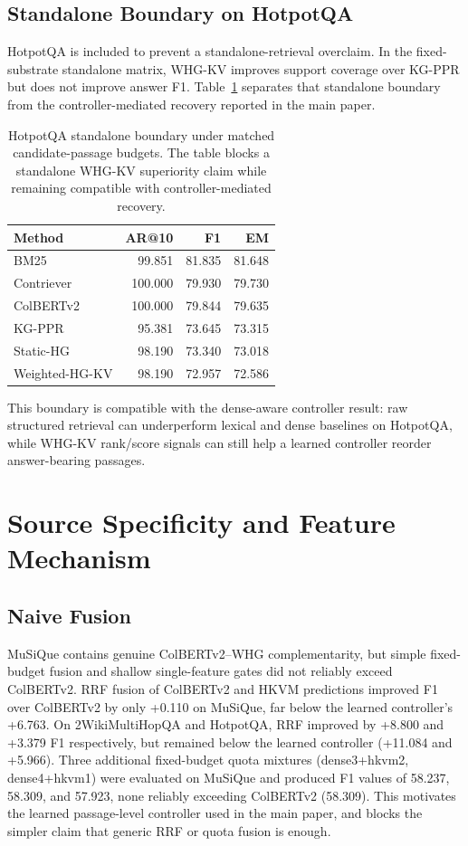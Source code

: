 \documentclass[conference]{IEEEtran}
\newcommand{\whg}{Weighted-HG-KV}
\begin{document}
\subsection{Standalone Boundary on HotpotQA}

HotpotQA is included to prevent a standalone-retrieval overclaim. In the fixed-substrate standalone matrix, WHG-KV improves support coverage over KG-PPR but does not improve answer F1. Table~\ref{tab:supp_hotpot_boundary} separates that standalone boundary from the controller-mediated recovery reported in the main paper.

\begin{table}[t]
\caption{HotpotQA standalone boundary under matched candidate-passage budgets. The table blocks a standalone WHG-KV superiority claim while remaining compatible with controller-mediated recovery.}
\label{tab:supp_hotpot_boundary}
\centering
\scriptsize
\begin{tabular}{lrrr}
\toprule
Method & AR@10 & F1 & EM \\
\midrule
BM25 & 99.851 & 81.835 & 81.648 \\
Contriever & 100.000 & 79.930 & 79.730 \\
ColBERTv2 & 100.000 & 79.844 & 79.635 \\
KG-PPR & 95.381 & 73.645 & 73.315 \\
Static-HG & 98.190 & 73.340 & 73.018 \\
\whg{} & 98.190 & 72.957 & 72.586 \\
\bottomrule
\end{tabular}
\end{table}

This boundary is compatible with the dense-aware controller result: raw structured retrieval can underperform lexical and dense baselines on HotpotQA, while WHG-KV rank/score signals can still help a learned controller reorder answer-bearing passages.

\section{Source Specificity and Feature Mechanism}

\subsection{Naive Fusion}

MuSiQue contains genuine ColBERTv2--WHG complementarity, but simple fixed-budget fusion and shallow single-feature gates did not reliably exceed ColBERTv2. RRF fusion of ColBERTv2 and HKVM predictions improved F1 over ColBERTv2 by only +0.110 on MuSiQue, far below the learned controller's +6.763. On 2WikiMultiHopQA and HotpotQA, RRF improved by +8.800 and +3.379 F1 respectively, but remained below the learned controller (+11.084 and +5.966). Three additional fixed-budget quota mixtures (dense3+hkvm2, dense4+hkvm1) were evaluated on MuSiQue and produced F1 values of 58.237, 58.309, and 57.923, none reliably exceeding ColBERTv2 (58.309). This motivates the learned passage-level controller used in the main paper, and blocks the simpler claim that generic RRF or quota fusion is enough.
\end{document}

